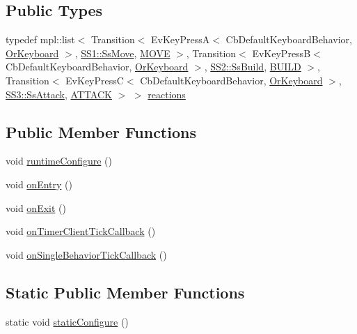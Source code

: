 \subsection*{Public Types}
\begin{DoxyCompactItemize}
\item 
typedef mpl\+::list$<$ Transition$<$ Ev\+Key\+PressA$<$ Cb\+Default\+Keyboard\+Behavior, \hyperlink{classsm__starcraft__ai_1_1OrKeyboard}{Or\+Keyboard} $>$, \hyperlink{structsm__starcraft__ai_1_1SS1_1_1SsMove}{S\+S1\+::\+Ss\+Move}, \hyperlink{structsm__starcraft__ai_1_1StObserve_1_1MOVE}{M\+O\+VE} $>$, Transition$<$ Ev\+Key\+PressB$<$ Cb\+Default\+Keyboard\+Behavior, \hyperlink{classsm__starcraft__ai_1_1OrKeyboard}{Or\+Keyboard} $>$, \hyperlink{structsm__starcraft__ai_1_1SS2_1_1SsBuild}{S\+S2\+::\+Ss\+Build}, \hyperlink{structsm__starcraft__ai_1_1StObserve_1_1BUILD}{B\+U\+I\+LD} $>$, Transition$<$ Ev\+Key\+PressC$<$ Cb\+Default\+Keyboard\+Behavior, \hyperlink{classsm__starcraft__ai_1_1OrKeyboard}{Or\+Keyboard} $>$, \hyperlink{structsm__starcraft__ai_1_1SS3_1_1SsAttack}{S\+S3\+::\+Ss\+Attack}, \hyperlink{structsm__starcraft__ai_1_1StObserve_1_1ATTACK}{A\+T\+T\+A\+CK} $>$ $>$ \hyperlink{structsm__starcraft__ai_1_1StObserve_ad3194a0d80ad2e5f716d6821abc0a551}{reactions}
\end{DoxyCompactItemize}
\subsection*{Public Member Functions}
\begin{DoxyCompactItemize}
\item 
void \hyperlink{structsm__starcraft__ai_1_1StObserve_afcc3c6aecc44b88f421a3e9990f7efb4}{runtime\+Configure} ()
\item 
void \hyperlink{structsm__starcraft__ai_1_1StObserve_a3e75089d398dedc4e2f000035d58fc22}{on\+Entry} ()
\item 
void \hyperlink{structsm__starcraft__ai_1_1StObserve_ab5f55cf98f24160bf1841f026efa003b}{on\+Exit} ()
\item 
void \hyperlink{structsm__starcraft__ai_1_1StObserve_acb92d67845c27aead231cbf52b13e9c8}{on\+Timer\+Client\+Tick\+Callback} ()
\item 
void \hyperlink{structsm__starcraft__ai_1_1StObserve_ad546305bf7c7f7e730bbeb5cf320930d}{on\+Single\+Behavior\+Tick\+Callback} ()
\end{DoxyCompactItemize}
\subsection*{Static Public Member Functions}
\begin{DoxyCompactItemize}
\item 
static void \hyperlink{structsm__starcraft__ai_1_1StObserve_a9aa04128ad0fb18454d9ea2db4edca48}{static\+Configure} ()
\end{DoxyCompactItemize}
